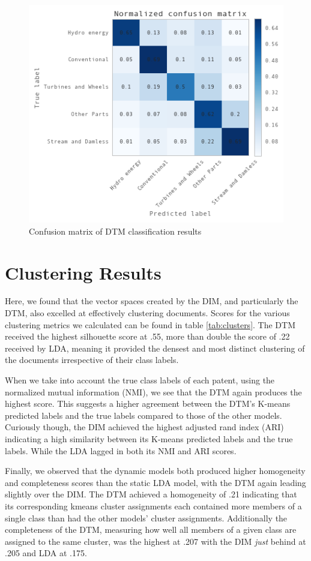 \begin{figure}[!htb]
\centering
\includegraphics[scale=0.65]{Figures/dtmclass}
\decoRule
\caption[dtmclass]{Confusion matrix of DTM classification results}
\label{fig:DTMmatrix}
\end{figure}


\section{Clustering Results}

Here, we found that the vector spaces created by the DIM, and particularly the DTM, also excelled at effectively clustering documents. Scores for the various clustering metrics we calculated can be found in table \ref{tab:clusters}. The DTM received the highest silhouette score at .55, more than double the score of .22 received by LDA, meaning it provided the densest and most distinct clustering of the documents irrespective of their class labels.

When we take into account the true class labels of each patent, using the normalized mutual information (NMI), we see that the DTM again produces the highest score. This suggests a higher agreement between the DTM's K-means predicted labels and the true labels compared to those of the other models. Curiously though, the DIM achieved the highest adjusted rand index (ARI) indicating a high similarity between its K-means predicted labels and the true labels. While the LDA lagged in both its NMI and ARI scores. 

Finally, we observed that the dynamic models both produced higher homogeneity and completeness scores than the static LDA model, with the DTM again leading slightly over the DIM. The DTM achieved a homogeneity of .21 indicating that its corresponding kmeans cluster assignments each contained more members of a single class than had the other models' cluster assignments. Additionally the completeness of the DTM, measuring how well all members of a given class are assigned to the same cluster, was the highest at .207 with the DIM \emph{just} behind at .205 and LDA at .175.

